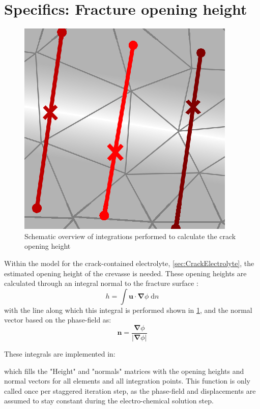 \documentclass[3p]{elsarticle} %
\begin{document}
\section{Specifics: Fracture opening height}
\label{sec:OpeningHeights}
\begin{figure}
	\centering
	\includegraphics{Figures/Example_OpeningHeight.eps}
	\caption{Schematic overview of integrations performed to calculate the crack opening height}
	\label{fig:OpeningHeightsFig}
\end{figure}

Within the model for the crack-contained electrolyte, \cref{sec:CrackElectrolyte}, the estimated opening height of the crevasse is needed. These opening heights are calculated through an integral normal to the fracture surface \citep{Yoshioka2020, Chukwudozie2019}:
\begin{equation}
    h = \int \mathbf{u}\cdot\bm{\nabla}\phi \; \mathrm{d}n \label{eq:heightmapping}
\end{equation}
with the line along which this integral is performed shown in \cref{fig:OpeningHeightsFig}, and the normal vector based on the phase-field as:
\begin{equation}
    \bm{n} = \frac{\bm{\nabla}\phi}{\left|\bm{\nabla}\phi\right|}
\end{equation}

These integrals are implemented in:

which fills the "Height" and "normals" matrices with the opening heights and normal vectors for all elements and all integration points. This function is only called once per staggered iteration step, as the phase-field and displacements are assumed to stay constant during the electro-chemical solution step. 
\end{document}
